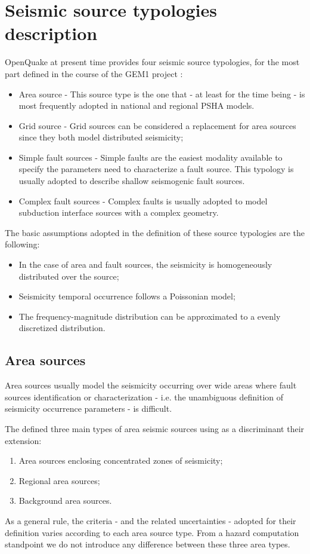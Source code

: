 \section{Seismic source typologies description}
\label{hazard:seismic_source_types}
OpenQuake at present time provides four seismic source typologies, for the 
most part defined in the course of the GEM1 project \citep{pagani2010}:
\begin{itemize}
\item Area source - This source type is the one that - at least for the time 
being - is most frequently adopted in national and regional PSHA models.
\item Grid source - Grid sources can be considered a replacement for area 
sources since they both model distributed seismicity;
\item Simple fault sources - Simple faults are the easiest modality available
to specify the parameters need to characterize a fault source. This typology
is usually adopted to describe shallow seismogenic fault sources.
\item Complex fault sources - Complex faults is usually adopted to model
subduction interface sources with a complex geometry. 
\end{itemize}

The basic assumptions adopted in the definition of these source typologies 
are the following:
\begin{itemize}
\item In the case of area and fault sources, the seismicity is homogeneously 
distributed over the source; 
\item Seismicity temporal occurrence follows a Poissonian model; 
\item The frequency-magnitude distribution can be approximated to a evenly 
discretized distribution. 
\end{itemize}
%
\subsection{Area sources}
\label{hazard:seismic_source_types:areaSources}
Area sources usually model the seismicity occurring over wide areas where fault 
sources identification or characterization - i.e. the unambiguous definition 
of seismicity occurrence parameters - is difficult. 

The \citet{sshac1997} defined three main types of area seismic sources using as 
a discriminant their extension:
\begin{enumerate}
\item Area sources enclosing concentrated zones of seismicity;
\item Regional area sources;
\item Background area sources.
\end{enumerate}
As a general rule, the criteria - and the related uncertainties - adopted for 
their definition varies according to each area source type. From a hazard 
computation standpoint we do not introduce any difference between these three 
area types.
%
